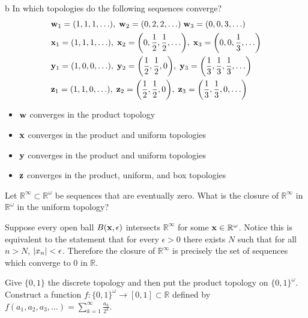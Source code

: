 \documentclass[11pt]{article}
\begin{document}
\begin{p}{b}
  In which topologies do the following sequences converge?
  \begin{align*}
    &\vb w_1 = (1, 1, 1, \ldots), \; \vb w_2 = (0, 2, 2, \ldots) \; \vb w_3 =
      (0, 0, 3, \ldots) \\
    &\vb x_1 = \qty(1,1,1,\ldots), \; \vb x_2 = \qty(0, \frac{1}{2}, \frac{1}{2},
      \ldots), \; \vb x_3 = \qty(0, 0, \frac{1}{3}, \ldots) \\
    &\vb y_1 = (1,0,0,\ldots), \; \vb y_2 = \qty(\frac{1}{2}, \frac{1}{2}, 0), \;
      \vb y_3 = \qty(\frac{1}{3}, \frac{1}{3}, \frac{1}{3}, \ldots) \\
    &\vb z_1 = (1, 1, 0, \ldots), \; \vb z_2 = \qty(\frac{1}{2}, \frac{1}{2},
      0), \; \vb z_3 = \qty(\frac{1}{3}, \frac{1}{3}, 0, \ldots)
  \end{align*}
\end{p}

\begin{itemize}
  \item $\vb w$ converges in the product topology
  \item $\vb x$ converges in the product and uniform topologies
  \item $\vb y$ converges in the product and uniform topologies
  \item $\vb z$ converges in the product, uniform, and box topologies
\end{itemize}

\begin{ex}{20.5}
  Let $\mathbb{R}^\infty \subset \mathbb{R}^\omega$ be sequences that are
  eventually zero. What is the closure of $\mathbb{R}^\infty$ in
  $\mathbb{R}^\omega$ in the uniform topology?
\end{ex}

\begin{solution}
  Suppose every open ball $B(\vb x, \epsilon)$ intersects $\mathbb{R}^\infty$
  for some $\vb x \in \mathbb{R}^\omega$. Notice this is equivalent to the
  statement that for every $\epsilon > 0$ there exists $N$ such that for all $n
  > N$, $\abs{x_n} < \epsilon$. Therefore the closure of $\mathbb{R}^\infty$ is
  precisely the set of sequences which converge to $0$ in $\mathbb{R}$.
\end{solution}


\noindent Give $\{0,1\}$ the discrete topology and then put the product
topology on $\{0,1\}^\omega$. Construct a function $f:\{0,1\}^\omega \to [0, 1]
\subset \mathbb{R}$ defined by $f(a_1, a_2, a_3, \ldots) = \sum_{k = 1}^\infty
\frac{a_k}{2^k}$.
\end{document}
